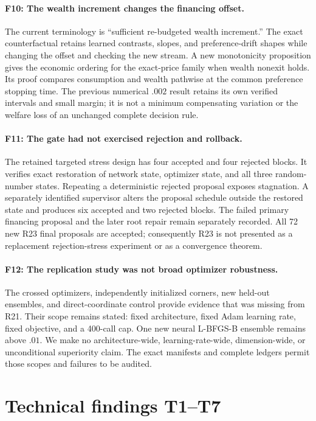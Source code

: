 \paragraph{F10: The wealth increment changes the financing offset.}
The current terminology is ``sufficient re-budgeted wealth increment.'' The exact counterfactual retains learned contrasts, slopes, and preference-drift shapes while changing the offset and checking the new stream. A new monotonicity proposition gives the economic ordering for the exact-price family when wealth nonexit holds. Its proof compares consumption and wealth pathwise at the common preference stopping time. The previous numerical $.002$ result retains its own verified intervals and small margin; it is not a minimum compensating variation or the welfare loss of an unchanged complete decision rule.

\paragraph{F11: The gate had not exercised rejection and rollback.}
The retained targeted stress design has four accepted and four rejected blocks. It verifies exact restoration of network state, optimizer state, and all three random-number states. Repeating a deterministic rejected proposal exposes stagnation. A separately identified supervisor alters the proposal schedule outside the restored state and produces six accepted and two rejected blocks. The failed primary financing proposal and the later root repair remain separately recorded. All 72 new R23 final proposals are accepted; consequently R23 is not presented as a replacement rejection-stress experiment or as a convergence theorem.

\paragraph{F12: The replication study was not broad optimizer robustness.}
The crossed optimizers, independently initialized corners, new held-out ensembles, and direct-coordinate control provide evidence that was missing from R21. Their scope remains stated: fixed architecture, fixed Adam learning rate, fixed objective, and a 400-call cap. One new neural L-BFGS-B ensemble remains above $.01$. We make no architecture-wide, learning-rate-wide, dimension-wide, or unconditional superiority claim. The exact manifests and complete ledgers permit those scopes and failures to be audited.

\section{Technical findings T1--T7}
